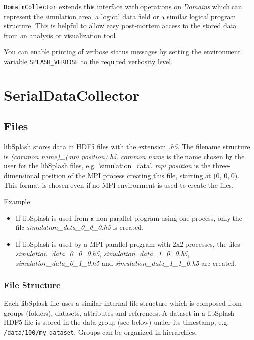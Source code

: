 \documentclass[a4paper,10pt,BCOR12mm]{report}
\newcommand{\command}[1]{\small \texttt{#1}}
\newcommand{\code}[1]{\small \texttt{#1}}
\begin{document}
\code{DomainCollector} extends this interface with operations on \emph{Domains} which can represent the simulation area,
a logical data field or a similar logical program structure.
This is helpful to allow easy post-mortem access to the stored data from an analysis or visualization tool.

You can enable printing of verbose status messages by setting the environment variable
\command{SPLASH\_VERBOSE} to the required verbosity level.


\chapter{SerialDataCollector}

\section{Files}

libSplash stores data in HDF5 files with the extension \emph{.h5}.
The filename structure is \emph{(common name)\_(mpi position).h5}.
\emph{common name} is the name chosen by the user for the libSplash files, e.g.
'simulation\_data'.
\emph{mpi position} is the three-dimensional position of the MPI process creating this
file, starting at (0, 0, 0).
This format is chosen even if no MPI environment is used to create the files.

Example:
\begin{itemize}
	\item If libSplash is used from a non-parallel program using one process,
	  only the file \emph{simulation\_data\_0\_0\_0.h5} is created.

	\item If libSplash is used by a MPI parallel program with 2x2 processes, the files
	\emph{simulation\_data\_0\_0\_0.h5}, \emph{simulation\_data\_1\_0\_0.h5},
	\emph{simulation\_data\_0\_1\_0.h5} and \emph{simulation\_data\_1\_1\_0.h5} are created.
\end{itemize}


\subsection{File Structure}

Each libSplash file uses a similar internal file structure which is composed from groups (folders),
datasets, attributes and references. A dataset in a libSplash HDF5 file is stored in the data group
(see below) under its timestamp, e.g. \code{/data/100/my\_dataset}.
Groups can be organized in hierarchies.
\end{document}
